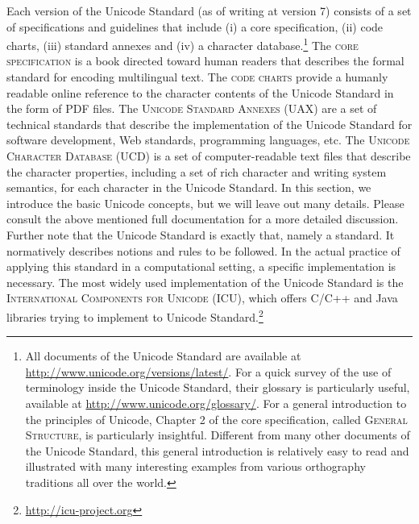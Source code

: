 Each version of the Unicode Standard (as of writing at version 7) consists of a set of specifications and guidelines that include (i) a core specification, (ii) code charts, (iii) standard annexes and (iv) a character database.\footnote{All documents of the Unicode Standard are available at \url{http://www.unicode.org/versions/latest/}. For a quick survey of the use of terminology inside the Unicode Standard, their glossary is particularly useful, available at \url{http://www.unicode.org/glossary/}. For a general introduction to the principles of Unicode, Chapter 2 of the core specification, called \textsc{General Structure}, is particularly insightful. Different from many other documents of the Unicode Standard, this general introduction is relatively easy to read and illustrated with many interesting examples from various orthography traditions all over the world.} The \textsc{core specification} is a book directed toward human readers that describes the formal standard for encoding multilingual text. The \textsc{code charts} provide a humanly readable online reference to the character contents of the Unicode Standard in the form of PDF files. The \textsc{Unicode Standard Annexes (UAX)} are a set of technical standards that describe the implementation of the Unicode Standard for software development, Web standards, programming languages, etc. The \textsc{Unicode Character Database (UCD)} is a set of computer-readable text files that describe the character properties, including a set of rich character and writing system semantics, for each character in the Unicode Standard. In this section, we introduce the basic Unicode concepts, but we will leave out many details. Please consult the above mentioned full documentation for a more detailed discussion. Further note that the Unicode Standard is exactly that, namely a standard. It normatively describes notions and rules to be followed. In the actual practice of applying this standard in a computational setting, a specific implementation is necessary. The most widely used implementation of the Unicode Standard is the \textsc{International Components for Unicode (ICU)}, which offers C/C++ and Java libraries trying to implement to Unicode Standard.\footnote{\url{http://icu-project.org}}

